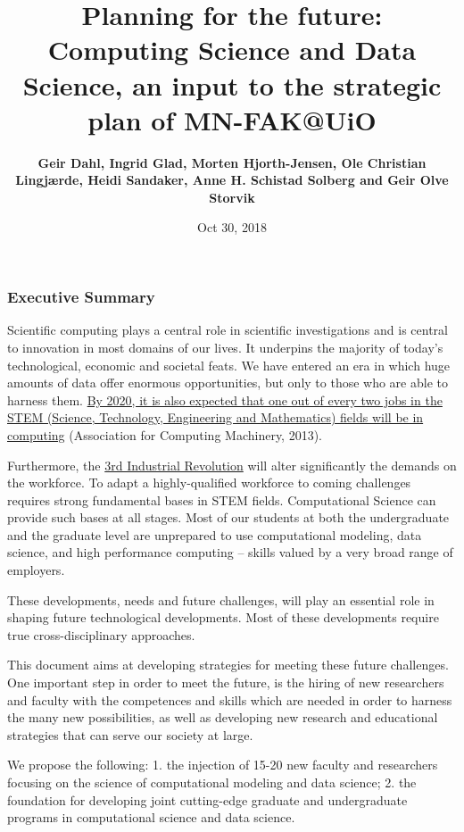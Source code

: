 \documentclass[]{article}
\title{Planning for the future: Computing Science and Data Science, an input to
the strategic plan of MN-FAK@UiO}
\author{\textbf{Geir Dahl, Ingrid Glad, Morten Hjorth-Jensen, Ole Christian
Lingjærde, Heidi Sandaker, Anne H. Schistad Solberg and Geir Olve
Storvik}}
\date{Oct 30, 2018}
\begin{document}
\maketitle

\hypertarget{executive-summary}{%
\subsubsection{Executive Summary}\label{executive-summary}}

Scientific computing plays a central role in scientific investigations
and is central to innovation in most domains of our lives. It underpins
the majority of today's technological, economic and societal feats. We
have entered an era in which huge amounts of data offer enormous
opportunities, but only to those who are able to harness them.
\href{http://pathways.acm.org/executive-summary.html}{By 2020, it is
also expected that one out of every two jobs in the STEM (Science,
Technology, Engineering and Mathematics) fields will be in computing}
(Association for Computing Machinery, 2013).

Furthermore, the \href{http://www.economist.com/node/21553017}{3rd
Industrial Revolution} will alter significantly the demands on the
workforce. To adapt a highly-qualified workforce to coming challenges
requires strong fundamental bases in STEM fields. Computational Science
can provide such bases at all stages. Most of our students at both the
undergraduate and the graduate level are unprepared to use computational
modeling, data science, and high performance computing -- skills valued
by a very broad range of employers.

These developments, needs and future challenges, will play an essential
role in shaping future technological developments. Most of these
developments require true cross-disciplinary approaches.

This document aims at developing strategies for meeting these future
challenges. One important step in order to meet the future, is the
hiring of new researchers and faculty with the competences and skills
which are needed in order to harness the many new possibilities, as well
as developing new research and educational strategies that can serve our
society at large.

We propose the following: 1. the injection of 15-20 new faculty and
researchers focusing on the science of computational modeling and data
science; 2. the foundation for developing joint cutting-edge graduate
and undergraduate programs in computational science and data science.
\end{document}
